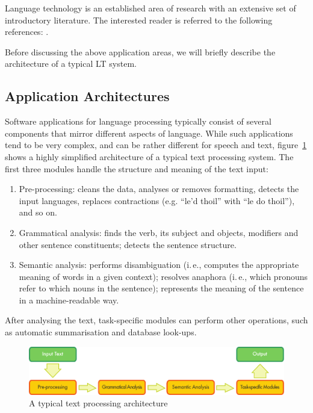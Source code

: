 \begin{multicols}{2}
Language technology is an established area of research with an extensive set of introductory literature. The interested reader is referred to the following references: \cite{carstensen-etal1, jurafsky-martin01, manning-schuetze1, lt-world1, lt-survey1}. 

Before discussing the above application areas, we will briefly describe the architecture of a typical LT system.

\subsection{Application Architectures}

Software applications for language processing typically consist of several components that mirror different aspects of language. While such applications tend to be very complex, and can be rather different for speech and text, figure~\ref{fig:textprocessingarch_en} shows a highly simplified architecture of a typical text processing system. The first three modules handle the structure and meaning of the text input:

\begin{enumerate}
\item Pre-processing: cleans the data, analyses or removes formatting, detects the input languages, replaces contractions (e.g. ``le’d thoil'' with ``le do thoil''), and so on.
\item Grammatical analysis: finds the verb, its subject and objects, modifiers and other sentence constituents; detects the sentence structure.
\item Semantic analysis: performs disambiguation (i.\,e., computes the appropriate meaning of words in a given context); resolves anaphora (i.\,e., which pronouns refer to which nouns in the sentence); represents the meaning of the sentence in a machine-readable way.
\end{enumerate}

After analysing the text, task-specific modules can perform other operations, such as automatic summarisation and database look-ups.

\begin{figure}[htb]
  \center
  \includegraphics[width=\textwidth]{../_media/english/text_processing_app_architecture}
  \caption{A typical text processing architecture}
  \label{fig:textprocessingarch_en}
\end{figure}


\end{multicols}
